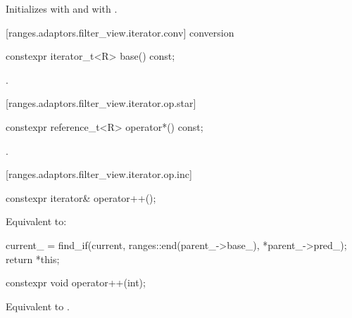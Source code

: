 \begin{itemdescr}
\pnum
\effects Initializes  with  and 
with .
\end{itemdescr}

[ranges.adaptors.filter_view.iterator.conv]{ conversion}

%
\begin{itemdecl}
constexpr iterator_t<R> base() const;
\end{itemdecl}

\begin{itemdescr}
\pnum
\returns {}.
\end{itemdescr}

[ranges.adaptors.filter_view.iterator.op.star]{}

%
\begin{itemdecl}
constexpr reference_t<R> operator*() const;
\end{itemdecl}

\begin{itemdescr}
\pnum
\returns {}.
\end{itemdescr}

[ranges.adaptors.filter_view.iterator.op.inc]{}

%
\begin{itemdecl}
constexpr iterator& operator++();
\end{itemdecl}

\begin{itemdescr}
\pnum
\effects Equivalent to:
\begin{codeblock}
current_ = find_if(current, ranges::end(parent_->base_), *parent_->pred_);
return *this;
\end{codeblock}
\end{itemdescr}

%
\begin{itemdecl}
constexpr void operator++(int);
\end{itemdecl}

\begin{itemdescr}
\pnum
\effects Equivalent to .
\end{itemdescr}

